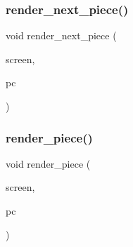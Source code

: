 \subsubsection{render\+\_\+next\+\_\+piece()}
{\footnotesize\ttfamily void render\+\_\+next\+\_\+piece (\begin{DoxyParamCaption}\item[{S\+D\+L\+\_\+\+Surface $\ast$}]{screen,  }\item[{struct \textbf{ piece}}]{pc }\end{DoxyParamCaption})}

\mbox{\label{render_8c_a279af1bf532d87bb3e19de4ac662e47b}} 
\subsubsection{render\+\_\+piece()}
{\footnotesize\ttfamily void render\+\_\+piece (\begin{DoxyParamCaption}\item[{S\+D\+L\+\_\+\+Surface $\ast$}]{screen,  }\item[{struct \textbf{ piece}}]{pc }\end{DoxyParamCaption})}

